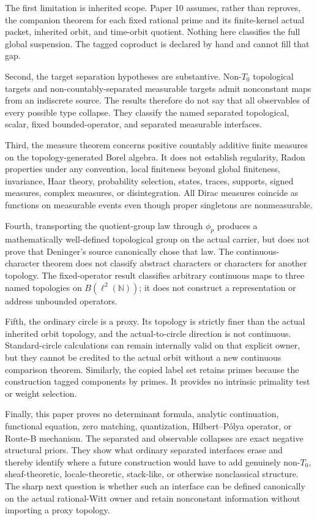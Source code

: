 \documentclass[11pt]{article}
\theoremstyle{definition}
\newcommand{\N}{\mathbb N}
\begin{document}
The first limitation is inherited scope.  Paper 10 assumes, rather than reproves, the companion theorem for each fixed rational prime and its finite-kernel actual packet, inherited orbit, and time-orbit quotient.  Nothing here classifies the full global suspension.  The tagged coproduct is declared by hand and cannot fill that gap.

Second, the target separation hypotheses are substantive.  Non-$T_0$ topological targets and non-countably-separated measurable targets admit nonconstant maps from an indiscrete source.  The results therefore do not say that all observables of every possible type collapse.  They classify the named separated topological, scalar, fixed bounded-operator, and separated measurable interfaces.

Third, the measure theorem concerns positive countably additive finite measures on the topology-generated Borel algebra.  It does not establish regularity, Radon properties under any convention, local finiteness beyond global finiteness, invariance, Haar theory, probability selection, states, traces, supports, signed measures, complex measures, or disintegration.  All Dirac measures coincide as functions on measurable events even though proper singletons are nonmeasurable.

Fourth, transporting the quotient-group law through $\phi_p$ produces a mathematically well-defined topological group on the actual carrier, but does not prove that Deninger's source canonically chose that law.  The continuous-character theorem does not classify abstract characters or characters for another topology.  The fixed-operator result classifies arbitrary continuous maps to three named topologies on $B(\ell^2(\N))$; it does not construct a representation or address unbounded operators.

Fifth, the ordinary circle is a proxy.  Its topology is strictly finer than the actual inherited orbit topology, and the actual-to-circle direction is not continuous.  Standard-circle calculations can remain internally valid on that explicit owner, but they cannot be credited to the actual orbit without a new continuous comparison theorem.  Similarly, the copied label set retains primes because the construction tagged components by primes.  It provides no intrinsic primality test or weight selection.

Finally, this paper proves no determinant formula, analytic continuation, functional equation, zero matching, quantization, Hilbert--P\'olya operator, or Route-B mechanism.  The separated and observable collapses are exact negative structural priors.  They show what ordinary separated interfaces erase and thereby identify where a future construction would have to add genuinely non-$T_0$, sheaf-theoretic, locale-theoretic, stack-like, or otherwise nonclassical structure.  The sharp next question is whether such an interface can be defined canonically on the actual rational-Witt owner and retain nonconstant information without importing a proxy topology.
\end{document}
